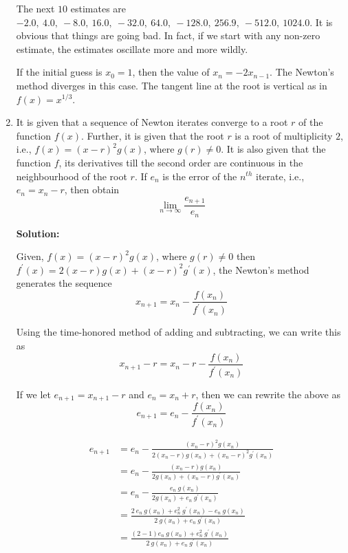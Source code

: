 \documentclass[a4paper,11pt]{report}
\begin{document}
\begin{enumerate}
    The next $10$ estimates are $-2.0,\ 4.0,\ -8.0,\ 16.0,\ -32.0,\ 64.0,\
    -128.0,\ 256.9,\ -512.0,\ 1024.0$. It is obvious that things are going bad.
    In fact, if we start with any non-zero estimate, the estimates oscillate 
    more and more wildly.

    If the initial guess is $x_{0} = 1$, then the value of $x_{n} = -2x_{n-1}$.
    The Newton's method diverges in this case. The tangent line at the root is
    vertical as in $f(x) = x^{1/3}$.


    \item It is given that a sequence of Newton iterates converge to a root $r$ of the
    function $f(x)$. Further, it is given that the root $r$ is a root of multiplicity
    $2$, i.e., $f(x) = (x - r)^{2} g(x)$, where $g(r) \ne 0$. It is also given that the
    function $f$, its derivatives till the second order are continuous in the
    neighbourhood of the root $r$. If $e_{n}$ is the error of the $n^{th}$ iterate,
    i.e., $e_{n} = x_{n} - r$, then obtain
    \begin{equation*}
    \lim_{n \rightarrow \infty} \frac{e_{n+1}}{e_{n}}
    \end{equation*}

    \textbf{Solution:}
    
    Given, $f(x) = (x-r)^{2} g(x)$, where $g(r) \ne 0$ then $f^{\prime}(x) = 2(x-r) g(x) + (x-r)^{2} g^{\prime}(x)$, the Newton's method generates the sequence
    \begin{equation*}
    x_{n+1} = x_{n} - \frac{f(x_{n})}{f^{\prime}(x_{n})} 
    \end{equation*}

    Using the time-honored method of adding and subtracting, we can write this as
    \begin{equation*}
    x_{n+1} - r = x_{n} - r - \frac{f(x_{n})}{f^{\prime}(x_{n})}
    \end{equation*}
    
    If we let $e_{n+1} = x_{n+1} - r$ and $e_{n} = x_{n} + r$, then we can rewrite the above as
    \begin{equation*}
    e_{n+1} = e_{n} - \frac{f(x_{n})}{f^{\prime}(x_{n})}
    \end{equation*}

    \begin{equation*}
    \begin{aligned}
    e_{n+1} &= e_{n} - \frac{(x_{n} - r)^{2} g(x_{n})}{2(x_{n} - r) g(x_{n}) + (x_{n} - r)^{2} g^{\prime}(x_{n})} \\
            &= e_{n} - \frac{(x_{n} - r) g(x_{n})}{2 g(x_{n}) + (x_{n} - r) g^{\prime}(x_{n})} \\
            &= e_{n} - \frac{e_{n}\ g(x_{n})}{2 g(x_{n}) + e_{n}\ g^{\prime}(x_{n})} \\
            &= \frac{2\ e_{n}\ g(x_{n}) + e_{n}^{2}\ g^{\prime}(x_{n}) - e_{n}\ g(x_{n})}{2\ g(x_{n}) + e_{n}\ g^{\prime}(x_{n})} \\
            &= \frac{(2 - 1)e_{n}\ g(x_{n}) + e_{n}^{2}\ g^{\prime}(x_{n})}{2\ g(x_{n}) + e_{n}\ g^{\prime}(x_{n})}
    \end{aligned}
    \end{equation*}
    

\end{enumerate}
\end{document}
